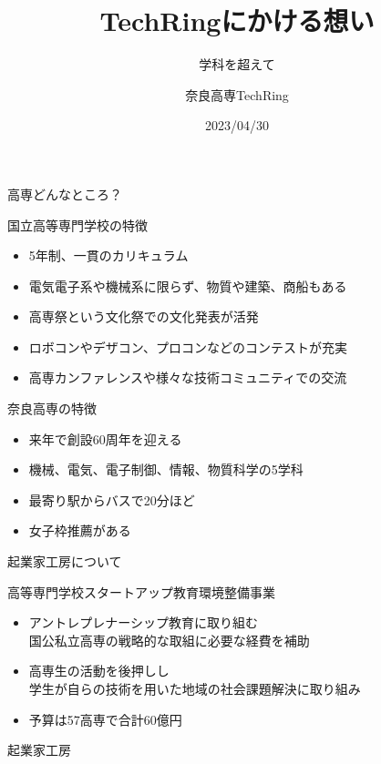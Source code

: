 \documentclass[dvipdfmx]{beamer}
\title{TechRingにかける想い}
\subtitle{学科を超えて}
\author[TechRing]{奈良高専TechRing}
\date[2023/04/30]{2023/04/30}
\begin{document}
\maketitle

\begin{frame}{高専どんなところ？}

  \begin{block}{国立高等専門学校の特徴}
    \begin{itemize}
      \item 5年制、一貫のカリキュラム
      \item 電気電子系や機械系に限らず、物質や建築、商船もある
      \item 高専祭という文化祭での文化発表が活発
      \item ロボコンやデザコン、プロコンなどのコンテストが充実
      \item 高専カンファレンスや様々な技術コミュニティでの交流
    \end{itemize}
  \end{block}

  \begin{alertblock}{奈良高専の特徴}
      \begin{itemize}
        \item 来年で創設60周年を迎える
        \item 機械、電気、電子制御、情報、物質科学の5学科
        \item 最寄り駅からバスで20分ほど
        \item 女子枠推薦がある
      \end{itemize}
  \end{alertblock}

\end{frame}

\begin{frame}{起業家工房について}

  \begin{alertblock}{高等専門学校スタートアップ教育環境整備事業}
      \begin{itemize}
        \item アントレプレナーシップ教育に取り組む\\
        国公私立高専の戦略的な取組に必要な経費を補助
        \item 高専生の活動を後押しし\\
        学生が自らの技術を用いた地域の社会課題解決に取り組み
        \item 予算は57高専で合計\alert{60億円}
      \end{itemize}
  \end{alertblock}

  \begin{exampleblock}{起業家工房}
    
  \end{exampleblock}
\end{frame}
\end{document}
